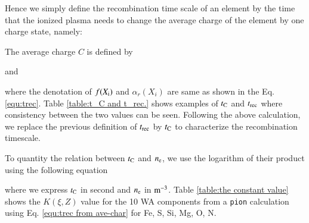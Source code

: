 \documentclass{aa}
\begin{document}






Hence we simply define the recombination time scale of an element by the time that the ionized plasma needs to change the average charge of the element by one charge state, namely:

The average charge $ C$ is defined by

and

where the denotation of $f(X_{\rm i})$ and $\alpha_{r}(X_{i})$ are same as shown in the Eq. \ref{equ:trec}.
Table \ref{table:t_C and t_rec.} shows examples of $ t_{\rm C}$ and $ t_{\rm rec}$ where consistency between the two values can be seen. 
Following the above calculation, we replace the previous definition of $t_{\rm rec}$ by $t_{\rm C}$ to characterize the recombination timescale. 

To quantity the relation between $ t_{\rm C}$ and $ n_{\rm e}$, we use the logarithm of their product using the following equation

where we express $t_{\rm C}$ in second and $n_{\rm e}$ in $\rm m^{-3}$.
Table \ref{table:the constant value} shows the $K(\xi, Z)$ value for the 10 WA components from a \texttt{pion} calculation using Eq. \ref{equ:trec from ave-char} for Fe, S, Si, Mg, O, N.



\end{document}
